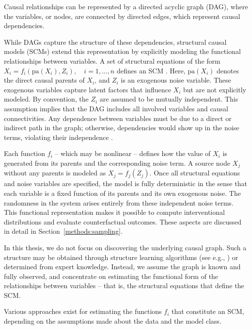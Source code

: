 Causal relationships can be represented by a directed acyclic graph (DAG), where the variables, or nodes, are connected by directed edges, which represent causal dependencies.

While DAGs capture the structure of these dependencies, structural causal models (SCMs) extend this representation by explicitly modeling the functional relationships between variables. A set of structural equations of the form $X_i = f_i(\text{pa}(X_i), Z_i), \quad i = 1, \dots, n$ defines an SCM \citep{pearl_book2009}. Here, $\text{pa}(X_i)$ denotes the direct causal parents of $X_i$, and $Z_i$ is an exogenous noise variable. These exogenous variables capture latent factors that influence $X_i$ but are not explicitly modeled. By convention, the $Z_i$ are assumed to be mutually independent. This assumption implies that the DAG includes all involved variables and causal connectivities. Any dependence between variables must be due to a direct or indirect path in the graph; otherwise, dependencies would show up in the noise terms, violating their independence \citep{pearl_book2009}.

Each function $f_i$ -- which may be nonlinear -- defines how the value of $X_i$ is generated from its parents and the corresponding noise term. A source node $X_j$ without any parents is modeled as $X_j = f_j(Z_j)$. Once all structural equations and noise variables are specified, the model is fully deterministic in the sense that each variable is a fixed function of its parents and its own exogenous noise. The randomness in the system arises entirely from these independent noise terms. This functional representation makes it possible to compute interventional distributions and evaluate counterfactual outcomes. These aspects are discussed in detail in Section~\ref{methods:sampling}.

In this thesis, we do not focus on discovering the underlying causal graph. Such a structure may be obtained through structure learning algorithms (see e.g., \citealp{zheng2018}) or determined from expert knowledge. Instead, we assume the graph is known and fully observed, and concentrate on estimating the functional form of the relationships between variables -- that is, the structural equations that define the SCM.

Various approaches exist for estimating the functions $f_i$ that constitute an SCM, depending on the assumptions made about the data and the model class.





